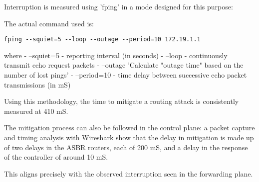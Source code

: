 Interruption is measured using 'fping' in a mode designed for this purpose:

The actual command used is:
\begin{verbatim}
fping --squiet=5 --loop --outage --period=10 172.19.1.1
\end{verbatim}
where
- --squiet=5 - reporting interval (in seconds)
- --loop - continuously transmit echo request packets
- --outage 'Calculate "outage time" based on the number of lost pings'
- --period=10 - time delay between successive echo packet transmissions (in mS)

Using this methodology, the time to mitigate a routing attack is consistently measured at 410 mS.

The mitigation process can also be followed in the control plane:
a packet capture and timing analysis with Wireshark show that the delay in mitigation is made up of two delays in the ASBR routers, each of 200 mS, and a delay in the response of the controller of around 10 mS.

This aligns precisely with the observed interruption seen in the forwarding plane.
